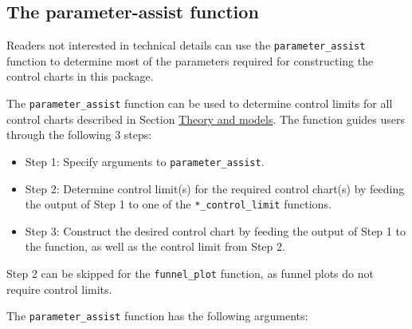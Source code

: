 \hypertarget{sec:parassistfct}{%
\subsection{The parameter-assist function}\label{sec:parassistfct}}

Readers not interested in technical details can use the \texttt{parameter\_assist} function to determine most of the parameters required for constructing the control charts in this package.

The \texttt{parameter\_assist} function can be used to determine control limits for all control charts described in Section \protect\hyperlink{sec:TheoryandModels}{Theory and models}. The function guides users through the following \(3\) steps:

\begin{itemize}
\tightlist
\item
  Step 1: Specify arguments to \texttt{parameter\_assist}.
\item
  Step 2: Determine control limit(s) for the required control chart(s) by feeding the output of Step 1 to one of the \texttt{*\_control\_limit} functions.
\item
  Step 3: Construct the desired control chart by feeding the output of Step 1 to the function, as well as the control limit from Step 2.
\end{itemize}

Step 2 can be skipped for the \texttt{funnel\_plot} function, as funnel plots do not require control limits.

The \texttt{parameter\_assist} function has the following arguments:

